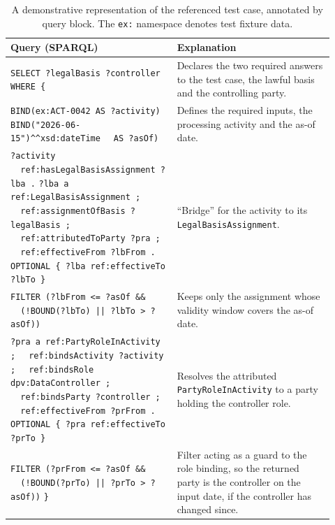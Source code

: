 \documentclass[10pt,letterpaper,twocolumn,twoside]{rho-class/rho}
\begin{document}
\begin{table}[ht]
\centering
\caption{A demonstrative representation of the referenced test case, annotated by query block. The \texttt{ex:} namespace denotes test fixture data.}
\label{tab:testcase}
\footnotesize
\begin{tabular}{@{}p{0.47\linewidth} p{0.45\linewidth}@{}}
\hline
Query (SPARQL) & Explanation \\
\hline
\texttt{SELECT ?legalBasis ?controller}\newline
\texttt{WHERE \{} &
Declares the two required answers to the test case, the lawful basis and the controlling party. \\
\addlinespace[2pt]
\texttt{BIND(ex:ACT-0042 AS ?activity)}\newline
\texttt{BIND("2026-06-15")\textasciicircum\textasciicircum{}xsd:dateTime}\newline
\texttt{~~AS ?asOf)} &
Defines the required inputs, the processing activity and the as-of date. \\
\addlinespace[2pt]
\texttt{?activity}\newline
\texttt{~~ref:hasLegalBasisAssignment ?lba .}\newline
\texttt{?lba a ref:LegalBasisAssignment ;}\newline
\texttt{~~ref:assignmentOfBasis ?legalBasis ;}\newline
\texttt{~~ref:attributedToParty ?pra ;}\newline
\texttt{~~ref:effectiveFrom ?lbFrom .}\newline
\texttt{OPTIONAL \{ ?lba ref:effectiveTo ?lbTo \}} &
``Bridge'' for the activity to its \texttt{LegalBasisAssignment}. \\
\addlinespace[2pt]
\texttt{FILTER (?lbFrom <= ?asOf \&\&}\newline
\texttt{~~(!BOUND(?lbTo) || ?lbTo > ?asOf))} &
Keeps only the assignment whose validity window covers the as-of date. \\
\addlinespace[2pt]
\texttt{?pra a ref:PartyRoleInActivity ;}\newline
\texttt{~~ref:bindsActivity ?activity ;}\newline
\texttt{~~ref:bindsRole dpv:DataController ;}\newline
\texttt{~~ref:bindsParty ?controller ;}\newline
\texttt{~~ref:effectiveFrom ?prFrom .}\newline
\texttt{OPTIONAL \{ ?pra ref:effectiveTo ?prTo \}} &
Resolves the attributed \texttt{PartyRoleInActivity} to a party holding the controller role. \\
\addlinespace[2pt]
\texttt{FILTER (?prFrom <= ?asOf \&\&}\newline
\texttt{~~(!BOUND(?prTo) || ?prTo > ?asOf))}\newline
\texttt{\}} &
Filter acting as a guard to the role binding, so the returned party is the controller on the input date, if the controller has changed since. \\
\hline
\end{tabular}
\end{table}
\end{document}
